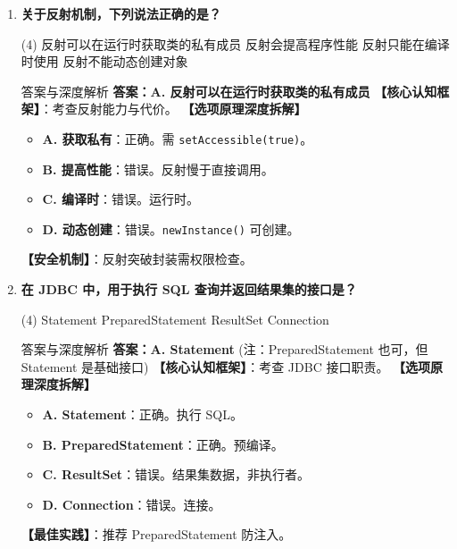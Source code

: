 ﻿\documentclass[12pt, a4paper]{ctexart}
\newcommand{\code}[1]{\texttt{#1}}
\begin{document}
\begin{enumerate}[label=\textbf{\arabic*.}, itemsep=1em]
	\item \textbf{关于反射机制，下列说法正确的是？}
	      \begin{tasks}(4)
		      \task 反射可以在运行时获取类的私有成员
		      \task 反射会提高程序性能
		      \task 反射只能在编译时使用
		      \task 反射不能动态创建对象
	      \end{tasks}
	      \begin{bluebox}{答案与深度解析}
		      \textbf{答案：A. 反射可以在运行时获取类的私有成员}
		      \textbf{【核心认知框架】}：考查反射能力与代价。
		      \textbf{【选项原理深度拆解】}
		      \begin{itemize}[leftmargin=*, nosep]
			      \item \textbf{A. 获取私有}：正确。需 \code{setAccessible(true)}。
			      \item \textbf{B. 提高性能}：错误。反射慢于直接调用。
			      \item \textbf{C. 编译时}：错误。运行时。
			      \item \textbf{D. 动态创建}：错误。\code{newInstance()} 可创建。
		      \end{itemize}
		      \textbf{【安全机制】}：反射突破封装需权限检查。
	      \end{bluebox}

	\item \textbf{在 JDBC 中，用于执行 SQL 查询并返回结果集的接口是？}
	      \begin{tasks}(4)
		      \task Statement \task PreparedStatement \task ResultSet \task Connection
	      \end{tasks}
	      \begin{bluebox}{答案与深度解析}
		      \textbf{答案：A. Statement} (注：PreparedStatement 也可，但 Statement 是基础接口)
		      \textbf{【核心认知框架】}：考查 JDBC 接口职责。
		      \textbf{【选项原理深度拆解】}
		      \begin{itemize}[leftmargin=*, nosep]
			      \item \textbf{A. Statement}：正确。执行 SQL。
			      \item \textbf{B. PreparedStatement}：正确。预编译。
			      \item \textbf{C. ResultSet}：错误。结果集数据，非执行者。
			      \item \textbf{D. Connection}：错误。连接。
		      \end{itemize}
		      \textbf{【最佳实践】}：推荐 PreparedStatement 防注入。
	      \end{bluebox}


\end{enumerate}
\end{document}
